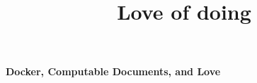 

\title{Love of doing}

\let\oldtitlepage\DoTitlepage
\def\DoTitlepage{}



\makeatletter

\begin{frame}[plain]
   \begin{focus}
      \Huge\bfseries{}Docker, Computable Documents, and Love
   \end{focus}
\end{frame}










\begin{frame}
   \focusCfalse
   \begin{focus}
      \AllLearnings
   \end{focus}
\end{frame}

\appendix

